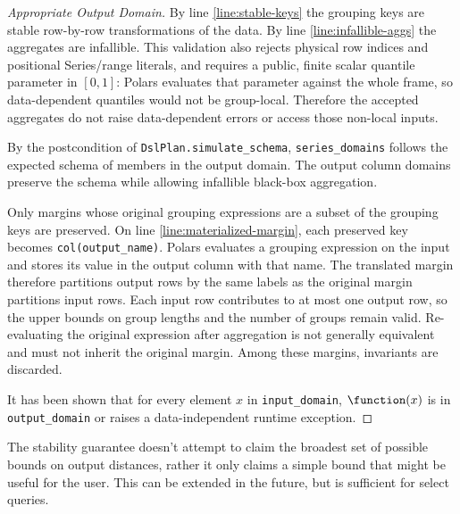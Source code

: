\documentclass{article}
\begin{document}
\begin{proof}[Appropriate Output Domain]
    By line \ref{line:stable-keys} the grouping keys are stable row-by-row transformations of the data.
    By line \ref{line:infallible-aggs} the aggregates are infallible.
    This validation also rejects physical row indices and positional Series/range
    literals, and requires a public, finite scalar quantile parameter in $[0,1]$:
    Polars evaluates that parameter
    against the whole frame, so data-dependent quantiles would not be group-local.
    Therefore the accepted aggregates do not raise data-dependent errors or
    access those non-local inputs.

    By the postcondition of \texttt{DslPlan.simulate\_schema},
    \texttt{series\_domains} follows the expected schema of members in the output domain.
    The output column domains preserve the schema while allowing infallible black-box aggregation.

    Only margins whose original grouping expressions are a subset of the grouping keys are preserved.
    On line \ref{line:materialized-margin}, each preserved key becomes \texttt{col(output\_name)}.
    Polars evaluates a grouping expression on the input and stores its value in the output column with that name.
    The translated margin therefore partitions output rows by the same labels as the original margin partitions input rows.
    Each input row contributes to at most one output row,
    so the upper bounds on group lengths and the number of groups remain valid.
    Re-evaluating the original expression after aggregation is not generally equivalent
    and must not inherit the original margin.
    Among these margins, invariants are discarded.

    It has been shown that for every element $x$ in \texttt{input\_domain}, $\function(x)$ is in \texttt{output\_domain} or raises a data-independent runtime exception.
\end{proof}


The stability guarantee doesn't attempt to claim the broadest set of possible bounds on output distances,
rather it only claims a simple bound that might be useful for the user.
This can be extended in the future, but is sufficient for select queries.
\end{document}
